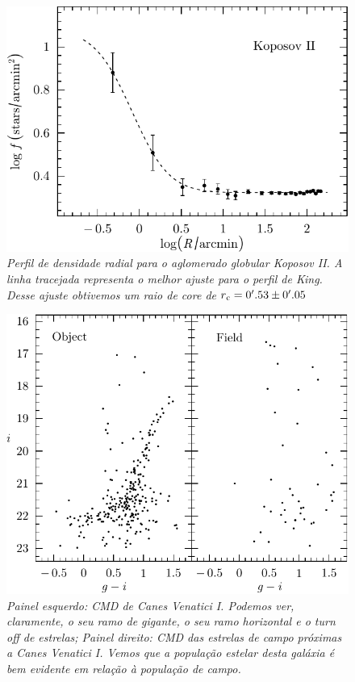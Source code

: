 \documentclass[
	12pt,				%
	openany,			%
	oneside,			%
	a4paper,			%
	english,			%
	brazil				%
	]{abntex2}
\begin{document}
\begin{figure}[H]
\begin{center}
\includegraphics[width=12cm]{figuras/King_profile_Koposov2.pdf}
\caption{\textit{Perfil de densidade radial para o aglomerado globular Koposov II. A linha tracejada representa o melhor ajuste para o perfil de King.  Desse ajuste obtivemos um raio de core de $ r\textsubscript{c} = 0'.53 \pm 0'.05$}}
\label{fig:kingKoII}
\end{center}
\end{figure}
\vspace{0.5cm}

\begin{figure}[H]
\begin{center}
\includegraphics[width=12cm]{figuras/cmdCVnI_ixgi.pdf}
\caption{\textit{Painel esquerdo: CMD de Canes Venatici I. Podemos ver, claramente, o seu ramo de gigante, o seu ramo horizontal e o turn off de estrelas; Painel direito: CMD das estrelas de campo próximas a Canes Venatici I. Vemos que a população estelar desta galáxia é bem evidente em  relação à população de campo. }}
\label{fig:cmdCVnI}
\end{center}
\end{figure}
\vspace{0.5cm}
\end{document}
